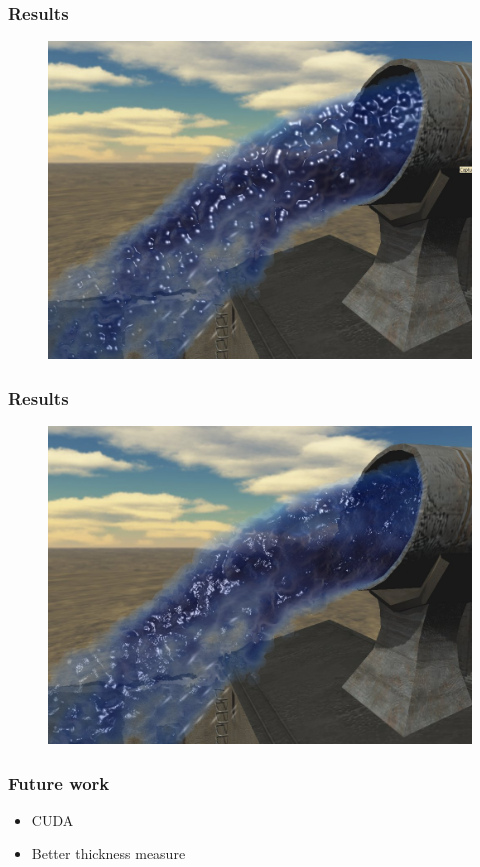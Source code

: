 \documentclass{beamer}
\begin{document}
	\begin{frame}[t]\frametitle{Results}
		\begin{figure}
			\centering
		    \includegraphics[width=.8\textwidth]{gaussian.png}
		\end{figure}
	\end{frame}
	\begin{frame}[t]\frametitle{Results}
		\begin{figure}
			\centering
		    \includegraphics[width=.8\textwidth]{curveFlow.png}
		\end{figure}
	\end{frame}
	\begin{frame}[t]\frametitle{Future work}
	    \begin{itemize}
	    	\item CUDA
	    	\item Better thickness measure
	    \end{itemize}
	\end{frame}
\end{document}
